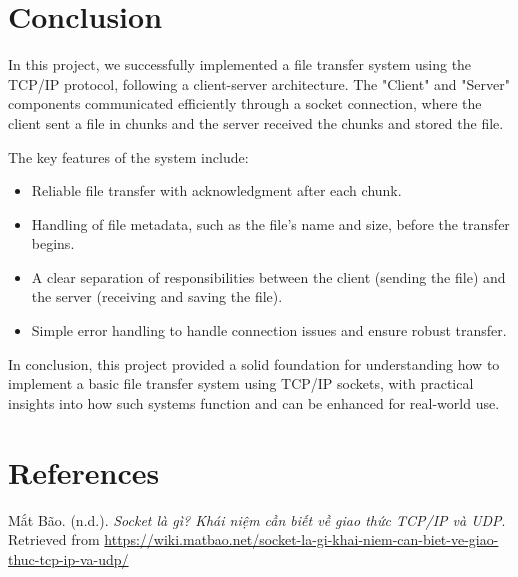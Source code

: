 \documentclass{article}
\begin{document}
\thispagestyle{empty}
    \newpage

\section{Conclusion}

In this project, we successfully implemented a file transfer system using the TCP/IP protocol, following a client-server architecture. The "Client" and "Server" components communicated efficiently through a socket connection, where the client sent a file in chunks and the server received the chunks and stored the file.

The key features of the system include:
\begin{itemize}
    \item Reliable file transfer with acknowledgment after each chunk.
    \item Handling of file metadata, such as the file's name and size, before the transfer begins.
    \item A clear separation of responsibilities between the client (sending the file) and the server (receiving and saving the file).
    \item Simple error handling to handle connection issues and ensure robust transfer.
\end{itemize}

In conclusion, this project provided a solid foundation for understanding how to implement a basic file transfer system using TCP/IP sockets, with practical insights into how such systems function and can be enhanced for real-world use.

\section{References}

\begin{thebibliography}{99}
    
     Mắt Bão. (n.d.). \textit{Socket là gì? Khái niệm cần biết về giao thức TCP/IP và UDP}. Retrieved from \url{https://wiki.matbao.net/socket-la-gi-khai-niem-can-biet-ve-giao-thuc-tcp-ip-va-udp/}
    
\end{thebibliography}
\end{document}
